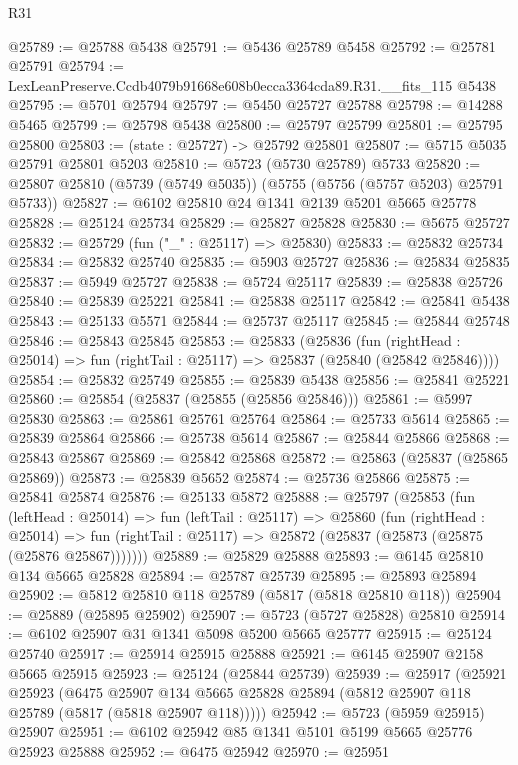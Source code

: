 \begin{lexlean}{R31}
\begin{coremodule}
@25789 := @25788 @5438
@25791 := @5436 @25789 @5458
@25792 := @25781 @25791
@25794 := LexLeanPreserve.Ccdb4079b91668e608b0ecca3364cda89.R31.__fits_115 @5438
@25795 := @5701 @25794
@25797 := @5450 @25727 @25788
@25798 := @14288 @5465
@25799 := @25798 @5438
@25800 := @25797 @25799
@25801 := @25795 @25800
@25803 := (state : @25727) -> @25792 @25801
@25807 := @5715 @5035 @25791 @25801 @5203
@25810 := @5723 (@5730 @25789) @5733
@25820 := @25807 @25810 (@5739 (@5749 @5035)) (@5755 (@5756 (@5757 @5203) @25791 @5733))
@25827 := @6102 @25810 @24 @1341 @2139 @5201 @5665 @25778
@25828 := @25124 @25734
@25829 := @25827 @25828
@25830 := @5675 @25727
@25832 := @25729 (fun ("_" : @25117) => @25830)
@25833 := @25832 @25734
@25834 := @25832 @25740
@25835 := @5903 @25727
@25836 := @25834 @25835
@25837 := @5949 @25727
@25838 := @5724 @25117
@25839 := @25838 @25726
@25840 := @25839 @25221
@25841 := @25838 @25117
@25842 := @25841 @5438
@25843 := @25133 @5571
@25844 := @25737 @25117
@25845 := @25844 @25748
@25846 := @25843 @25845
@25853 := @25833
    (@25836
      (fun (rightHead : @25014) => fun (rightTail : @25117) => @25837 (@25840 (@25842 @25846))))
@25854 := @25832 @25749
@25855 := @25839 @5438
@25856 := @25841 @25221
@25860 := @25854 (@25837 (@25855 (@25856 @25846)))
@25861 := @5997 @25830
@25863 := @25861 @25761 @25764
@25864 := @25733 @5614
@25865 := @25839 @25864
@25866 := @25738 @5614
@25867 := @25844 @25866
@25868 := @25843 @25867
@25869 := @25842 @25868
@25872 := @25863 (@25837 (@25865 @25869))
@25873 := @25839 @5652
@25874 := @25736 @25866
@25875 := @25841 @25874
@25876 := @25133 @5872
@25888 := @25797
    (@25853
      (fun (leftHead : @25014) =>
      fun (leftTail : @25117) =>
      @25860
        (fun (rightHead : @25014) =>
        fun (rightTail : @25117) => @25872 (@25837 (@25873 (@25875 (@25876 @25867)))))))
@25889 := @25829 @25888
@25893 := @6145 @25810 @134 @5665 @25828
@25894 := @25787 @25739
@25895 := @25893 @25894
@25902 := @5812 @25810 @118 @25789 (@5817 (@5818 @25810 @118))
@25904 := @25889 (@25895 @25902)
@25907 := @5723 (@5727 @25828) @25810
@25914 := @6102 @25907 @31 @1341 @5098 @5200 @5665 @25777
@25915 := @25124 @25740
@25917 := @25914 @25915 @25888
@25921 := @6145 @25907 @2158 @5665 @25915
@25923 := @25124 (@25844 @25739)
@25939 := @25917
    (@25921
      @25923
      (@6475
        @25907
        @134
        @5665
        @25828
        @25894
        (@5812 @25907 @118 @25789 (@5817 (@5818 @25907 @118)))))
@25942 := @5723 (@5959 @25915) @25907
@25951 := @6102 @25942 @85 @1341 @5101 @5199 @5665 @25776 @25923 @25888
@25952 := @6475 @25942
@25970 := @25951

\end{coremodule}
\end{lexlean}
